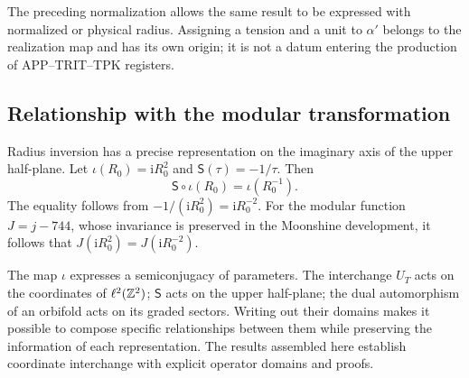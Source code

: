 The preceding normalization allows the same result to be expressed with
normalized or physical radius. Assigning a tension and a
unit to \(\alpha'\) belongs to the realization map and has
its own origin; it is not a datum entering the production
of APP--TRIT--TPK registers.

\subsection{Relationship with the modular transformation}

Radius inversion has a precise representation on the
imaginary axis of the upper half-plane. Let
\(\iota(R_0)=\mathrm iR_0^2\) and
\(\mathsf S(\tau)=-1/\tau\). Then
\begin{equation}
 \mathsf S\circ\iota(R_0)=\iota(R_0^{-1}).
 \label{iv:eq:semiconjugacion-modular}
\end{equation}
The equality follows from
\(-1/(\mathrm iR_0^2)=\mathrm iR_0^{-2}\). For the modular
function \(J=j-744\), whose invariance is preserved in the
Moonshine development, it follows that
\(J(\mathrm iR_0^2)=J(\mathrm iR_0^{-2})\).

The map \(\iota\) expresses a semiconjugacy of parameters.
The interchange \(U_T\) acts on the coordinates of
\(\ell^2(\mathbb Z^2)\); \(\mathsf S\) acts on the upper
half-plane; the dual automorphism of an orbifold acts on its
graded sectors. Writing out their domains makes it possible to
compose specific relationships between them while preserving the
information of each representation. The results assembled here
establish coordinate interchange with explicit
operator domains and proofs.
